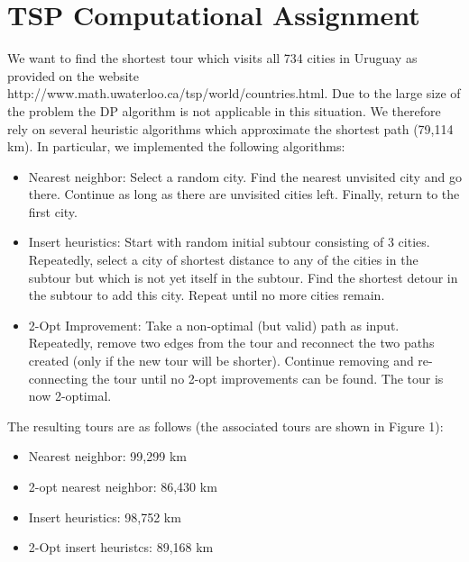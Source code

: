 \documentclass[11pt, oneside]{article}   	%
\begin{document}
\section{TSP Computational Assignment}
We want to find the shortest tour which visits all 734 cities in Uruguay as provided on the website http://www.math.uwaterloo.ca/tsp/world/countries.html. Due to the large size of the problem the DP algorithm is not applicable in this situation. We therefore rely on several heuristic algorithms which approximate the shortest path (79,114 km). In particular, we implemented the following algorithms:
\begin{itemize}
\item Nearest neighbor: Select a random city. Find the nearest unvisited city and go there. Continue as long as there are unvisited cities left. Finally, return to the first city.
\item Insert heuristics: Start with random initial subtour consisting of 3 cities. Repeatedly, select a city of shortest distance to any of the cities in the subtour but which is not yet itself in the subtour. Find the shortest detour in the subtour to add this city. Repeat until no more cities remain.
\item 2-Opt Improvement: Take a non-optimal (but valid) path as input. Repeatedly, remove two edges from the tour and reconnect the two paths created (only if the new tour will be shorter). Continue removing and re- connecting the tour until no 2-opt improvements can be found. The tour is now 2-optimal.
\end{itemize}

The resulting tours are as follows (the associated tours are shown in Figure 1):
\begin{itemize}
\item Nearest neighbor: 99,299 km
\item 2-opt nearest neighbor: 86,430 km
\item Insert heuristics: 98,752 km
\item 2-Opt insert heuristcs: 89,168 km
\end{itemize}
\end{document}
